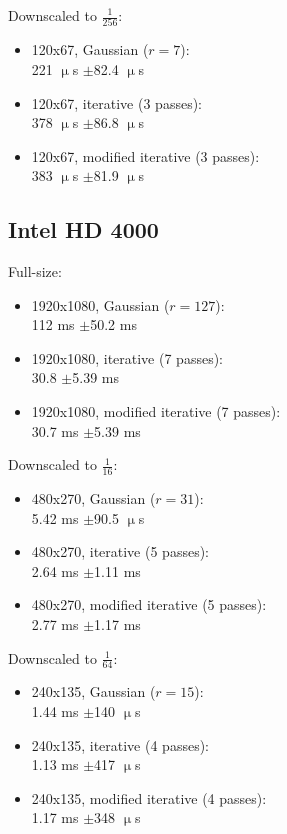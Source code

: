 \documentclass[english,fleqn,10pt,twocolumn]{article}
\begin{document}
Downscaled to $\frac 1{256}$:
\begin{itemize}
    \item 120x67, Gaussian ($r = 7$): \\
        221 $\upmu$s $\pm$82.4 $\upmu$s
    \item 120x67, iterative (3 passes): \\
        378 $\upmu$s $\pm$86.8 $\upmu$s
    \item 120x67, modified iterative (3 passes): \\
        383 $\upmu$s $\pm$81.9 $\upmu$s
\end{itemize}

\subsection{Intel HD 4000}

Full-size:
\begin{itemize}
    \item 1920x1080, Gaussian ($r = 127$): \\
        112 ms $\pm$50.2 ms
    \item 1920x1080, iterative (7 passes): \\
        30.8 $\pm$5.39 ms
    \item 1920x1080, modified iterative (7 passes): \\
        30.7 ms $\pm$5.39 ms
\end{itemize}

Downscaled to $\frac 1{16}$:
\begin{itemize}
    \item 480x270, Gaussian ($r = 31$): \\
        5.42 ms $\pm$90.5 $\upmu$s
    \item 480x270, iterative (5 passes): \\
        2.64 ms $\pm$1.11 ms
    \item 480x270, modified iterative (5 passes): \\
        2.77 ms $\pm$1.17 ms
\end{itemize}

Downscaled to $\frac 1{64}$:
\begin{itemize}
    \item 240x135, Gaussian ($r = 15$): \\
        1.44 ms $\pm$140 $\upmu$s
    \item 240x135, iterative (4 passes): \\
        1.13 ms $\pm$417 $\upmu$s
    \item 240x135, modified iterative (4 passes): \\
        1.17 ms $\pm$348 $\upmu$s
\end{itemize}
\end{document}
